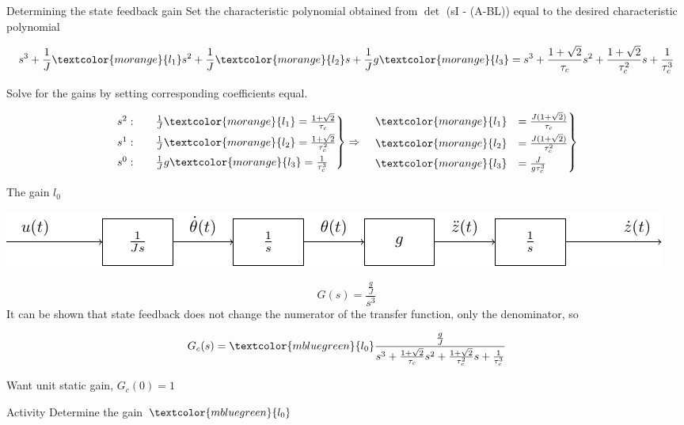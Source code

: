 \documentclass[presentation,aspectratio=169]{beamer}
\begin{document}
\begin{frame}[label={sec:org1280c4a}]{Determining the state feedback gain}
Set the characteristic polynomial obtained from \(\det\) \Big(sI - (A-B\textcolor{morange}{L})\Big) equal to the desired characteristic polynomial

\[ s^3 + \frac{1}{J}\textcolor{morange}{l_1}s^2 + \frac{1}{J}\textcolor{morange}{l_2}s + \frac{1}{J}g\textcolor{morange}{l_3} =  s^3 + \frac{1 + \sqrt{2}}{\tau_c}s^2 + \frac{1+\sqrt{2}}{\tau_c^2}s + \frac{1}{\tau_c^3} \]

Solve for the gains by setting corresponding coefficients equal.

\begin{equation*}
\begin{rcases}
s^2: \quad & \frac{1}{J}\textcolor{morange}{l_1} = \frac{1 + \sqrt{2}}{\tau_c}\\
s^1: \quad & \frac{1}{J}\textcolor{morange}{l_2} = \frac{1 + \sqrt{2}}{\tau_c^2}\\
s^0: \quad & \frac{1}{J}g\textcolor{morange}{l_3} = \frac{1}{\tau_c^3}
\end{rcases} \Rightarrow
\begin{rcases}
 \quad \textcolor{morange}{l_1} &= \frac{J(1 + \sqrt{2})}{\tau_c}\\
 \quad \textcolor{morange}{l_2} &= \frac{J(1 + \sqrt{2})}{\tau_c^2}\\
 \quad \textcolor{morange}{l_3} &= \frac{J}{g\tau_c^3}
\end{rcases}
\end{equation*}
\end{frame}


\begin{frame}[label={sec:orgbf28cad}]{The gain \(l_0\)}
\begin{center}
\includegraphics[width=0.6\linewidth]{../../figures/block-apollo}
\end{center}

\[ G(s) = \frac{\frac{g}{J}}{s^3}\]
It can be shown that state feedback does not change the numerator of the transfer function, only the denominator, so

\[G_c(s) = \textcolor{mbluegreen}{l_0}\frac{\frac{g}{J}}{s^3 + \frac{1 + \sqrt{2}}{\tau_c}s^2 + \frac{1+\sqrt{2}}{\tau_c^2}s + \frac{1}{\tau_c^3}}\]

Want unit static gain,  \(G_c(0) = 1\)

\pause

\alert{Activity} Determine the gain \(\textcolor{mbluegreen}{l_0}\)
\end{frame}
\end{document}
